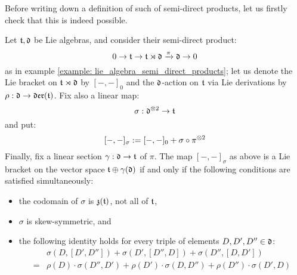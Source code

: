         Before writing down a definition of such  of semi-direct products, let us firstly check that this is indeed possible. 
        \begin{lemma} \label{lemma: twisted_semi_direct_products_well_definiteness}
            Let $\mathfrak{t}, \mathfrak{d}$ be Lie algebras, and consider their semi-direct product:
                $$0 \to \mathfrak{t} \to \mathfrak{t} \rtimes \mathfrak{d} \xrightarrow[]{\pi} \mathfrak{d} \to 0$$
            as in example \ref{example: lie_algebra_semi_direct_products}; let us denote the Lie bracket on $\mathfrak{t} \rtimes \mathfrak{d}$ by $[-, -]_0$ and the $\mathfrak{d}$-action on $\mathfrak{t}$ via Lie derivations by $\rho: \mathfrak{d} \to \mathfrak{der}(\mathfrak{t})$. Fix also a linear map:
                $$\sigma: \d^{\tensor 2} \to \t$$
            and put:
                \begin{equation} \label{equation: twisted_semi_direct_product_bracket}
                    [-, -]_{\sigma} := [-, -]_0 + \sigma \circ \pi^{\tensor 2}
                \end{equation}
            Finally, fix a linear section $\gamma: \mathfrak{d} \to \mathfrak{t}$ of $\pi$. The map $[-, -]_{\sigma}$ as above is a Lie bracket on the vector space $\mathfrak{t} \oplus \gamma(\mathfrak{d})$ if and only if the following conditions are satisfied simultaneously:
            \begin{itemize}
                \item the codomain of $\sigma$ is $\mathfrak{z}(\mathfrak{t})$, not all of $\mathfrak{t}$,
                \item $\sigma$ is skew-symmetric, and
                \item the following identity holds for every triple of elements $D, D', D'' \in \mathfrak{d}$:
                    $$
                        \begin{aligned}
                            & \sigma( D, [D', D''] ) + \sigma( D', [D'', D] ) + \sigma( D'', [D, D'] )
                            \\
                            = & \rho(D) \cdot \sigma(D'', D') + \rho(D') \cdot \sigma(D, D'') + \rho(D'') \cdot \sigma(D', D)
                        \end{aligned}
                    $$
            \end{itemize}
        \end{lemma}
